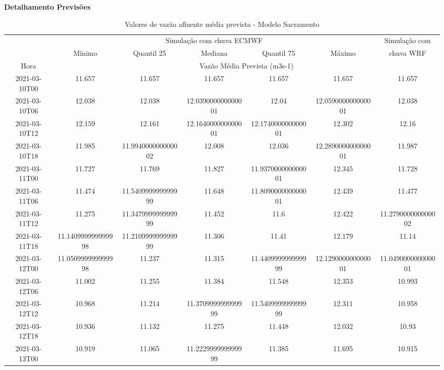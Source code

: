 \documentclass[a4paper,12pt]{article}
\begin{document}
\newpage
\textbf{\large{Detalhamento Previsões}}
\begin{table}[ht]
    \centering
    \caption{Valores de vazão afluente média prevista - Modelo Sacramento}
    \vspace{6pt}
    \begin{tabular}{|c|c|c|c|c|c|c|}
        \hline
        & \multicolumn{5}{|c|}{Simulação com chuva ECMWF} & Simulação com \\
        \hhline{~-----~}
        & Mínimo & Quantil 25 & Mediana & Quantil 75 & Máximo & chuva WRF \\
        \hhline{~------}
        Hora & \multicolumn{6}{|c|}{Vazão Média Prevista (m3s-1)} \\
        \hline
        2021-03-10T00 & 11.657 & 11.657 & 11.657 & 11.657 & 11.657 & 11.657 \\
        \hline
        2021-03-10T06 & 12.038 & 12.038 & 12.039000000000001 & 12.04 & 12.059000000000001 & 12.038 \\
        \hline
        2021-03-10T12 & 12.159 & 12.161 & 12.164000000000001 & 12.174000000000001 & 12.302 & 12.16 \\
        \hline
        2021-03-10T18 & 11.985 & 11.994000000000002 & 12.008 & 12.036 & 12.289000000000001 & 11.987 \\
        \hline
        2021-03-11T00 & 11.727 & 11.769 & 11.827 & 11.937000000000001 & 12.345 & 11.728 \\
        \hline
        2021-03-11T06 & 11.474 & 11.540999999999999 & 11.648 & 11.809000000000001 & 12.439 & 11.477 \\
        \hline
        2021-03-11T12 & 11.275 & 11.347999999999999 & 11.452 & 11.6 & 12.422 & 11.279000000000002 \\
        \hline
        2021-03-11T18 & 11.140999999999998 & 11.210999999999999 & 11.306 & 11.41 & 12.179 & 11.14 \\
        \hline
        2021-03-12T00 & 11.050999999999998 & 11.237 & 11.315 & 11.440999999999999 & 12.129000000000001 & 11.049000000000001 \\
        \hline
        2021-03-12T06 & 11.002 & 11.255 & 11.384 & 11.548 & 12.353 & 10.993 \\
        \hline
        2021-03-12T12 & 10.968 & 11.214 & 11.370999999999999 & 11.540999999999999 & 12.311 & 10.958 \\
        \hline
        2021-03-12T18 & 10.936 & 11.132 & 11.275 & 11.448 & 12.032 & 10.93 \\
        \hline
        2021-03-13T00 & 10.919 & 11.065 & 11.222999999999999 & 11.385 & 11.695 & 10.915 \\

\end{tabular}
\end{table}
\end{document}
